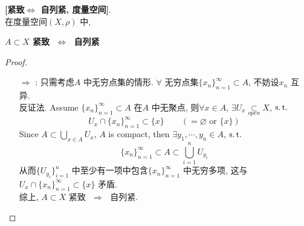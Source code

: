 	\begin{thm}\label{thm 1.6.2}
		\textbf{[紧致$\Leftrightarrow$ 自列紧, 度量空间]}. \\
		在度量空间$(X , \rho)$ 中, 
		\begin{center}
			\textbf{$A \subset X$ 紧致} $\,\, \Leftrightarrow \,\,$ \textbf{自列紧}
		\end{center}
	
		\vspace{4em}
		
		\begin{proof}
			\begin{enumerate}
				\item[$\Rightarrow$]: 只需考虑$A$ 中无穷点集的情形. $\forall$ 无穷点集$\{ x_n \}_{n = 1}^{\infty} \subset A$, 不妨设$x_n$ 互异. \\
				反证法. Assume $\{ x_n \}_{n = 1}^{\infty} \subset A$ 在$A$ 中无聚点, 则$\forall x \in A$, $\exists U_x \underset{open}{\subset} X$, $\operatorname{s.t.}$
				\[ U_x \cap \{ x_n \}_{n = 1}^{\infty} \subset \{ x \} \hspace{2em} \left( = \varnothing \,\, \text{or} \,\, \{ x \} \right) \]
				Since $A \subset \bigcup_{x \in A} U_x$, $A$ is compact, then $\exists y_1 , \cdots , y_n \in A$, $\operatorname{s.t.}$
				\[ \{ x_n \}_{n = 1}^{\infty} \subset A \subset \bigcup_{i = 1}^{n} U_{y_i} \]
				从而$\{ U_{y_i} \}_{i = 1}^{n}$ 中至少有一项中包含$\{ x_n \}_{n = 1}^{\infty}$ 中无穷多项, 这与$U_x \cap \{ x_n \}_{n = 1}^{\infty} \subset \{ x \}$ 矛盾. \\
				综上, $A \subset X$ 紧致 $\,\, \Rightarrow \,\,$ 自列紧.
				
				\vspace{6em}
				

\end{enumerate}
\end{proof}
\end{thm}
